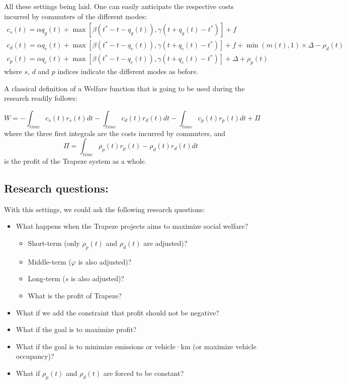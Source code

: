 \documentclass[english, a4paper]{article}
\theoremstyle{plain}
\begin{document}
All these settings being laid. One can easily anticipate the respective costs incurred by commuters of the different modes:
\begin{eqnarray}
    c_s(t) = \alpha q_g(t) + \max [\beta (t^* - t - q_g(t)), \gamma (t + q_g(t) - t^*)] + f\\
    c_d(t) = \alpha q_c(t) + \max [\beta (t^* - t - q_c(t)), \gamma (t + q_c(t) - t^*)] + f + \min(m(t), 1)\times \Delta - \rho _d(t)\\
    c_p(t) = \alpha q_c(t) + \max [\beta (t^* - t - q_c(t)), \gamma (t + q_c(t) - t^*)] + \Delta + \rho _p(t)
\end{eqnarray}
where $s$, $d$ and $p$ indices indicate the different modes as before.

A classical definition of a Welfare function that is going to be used during the research readily follows:

\begin{equation}
    W = -\int_{time} c_s(t)r_s(t)dt
    - \int_{time} c_d(t)r_d(t)dt
    - \int_{time} c_p(t)r_p(t)dt
    + \Pi
\end{equation}
where the three first integrals are the costs incurred by commuters, and
\begin{equation}
    \Pi = \int_{time} \rho_p(t)r_p(t) - \rho_d(t)r_d(t)dt
\end{equation}
is the profit of the Trapeze system as a whole.

\subsection{Research questions:}

With this settings, we could ask the following research questions:

\begin{itemize}
    \item What happens when the Trapeze projects aims to maximize social welfare?
    \begin{itemize}
        \item Short-term (only $\rho_p(t)$ and $\rho_d(t)$ are adjusted)?
        \item Middle-term ($\varphi$ is also adjusted)?
        \item Long-term ($s$ is also adjusted)?
        \item What is the profit of Trapeze?
    \end{itemize}
    \item What if we add the constraint that profit should not be negative?
    \item What if the goal is to maximize profit?
    \item What if the goal is to minimize emissions or vehicle·km (or maximize vehicle occupancy)?
    \item What if $\rho_p(t)$ and $\rho_d(t)$ are forced to be constant?
\end{itemize}
\end{document}
